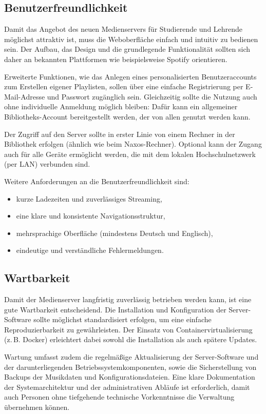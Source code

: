\documentclass[12pt,a4paper]{report}
\begin{document}
  \subsection{Benutzerfreundlichkeit}
  Damit das Angebot des neuen Medienservers für Studierende und Lehrende möglichst attraktiv ist, muss die Weboberfläche einfach und intuitiv zu bedienen sein. 
  Der Aufbau, das Design und die grundlegende Funktionalität sollten sich daher an bekannten Plattformen wie beispielsweise Spotify orientieren.  

  Erweiterte Funktionen, wie das Anlegen eines personalisierten Benutzeraccounts zum Erstellen eigener Playlisten, 
  sollen über eine einfache Registrierung per E-Mail-Adresse und Passwort zugänglich sein.  
  Gleichzeitig sollte die Nutzung auch ohne individuelle Anmeldung möglich bleiben: Dafür kann ein allgemeiner Bibliotheks-Account bereitgestellt werden, 
  der von allen genutzt werden kann.  

  Der Zugriff auf den Server sollte in erster Linie von einem Rechner in der Bibliothek erfolgen (ähnlich wie beim Naxos-Rechner). 
  Optional kann der Zugang auch für alle Geräte ermöglicht werden, die mit dem lokalen Hochschulnetzwerk (per LAN) verbunden sind.  

  Weitere Anforderungen an die Benutzerfreundlichkeit sind:
  \begin{itemize}
    \item kurze Ladezeiten und zuverlässiges Streaming,
    \item eine klare und konsistente Navigationsstruktur,
    \item mehrsprachige Oberfläche (mindestens Deutsch und Englisch),
    \item eindeutige und verständliche Fehlermeldungen.
  \end{itemize}

  \subsection{Wartbarkeit}
  Damit der Medienserver langfristig zuverlässig betrieben werden kann, ist eine gute Wartbarkeit entscheidend. 
  Die Installation und Konfiguration der Server-Software sollte möglichst standardisiert erfolgen, um eine einfache Reproduzierbarkeit zu gewährleisten. 
  Der Einsatz von Containervirtualisierung (z.\,B. Docker) erleichtert dabei sowohl die Installation als auch spätere Updates.  

  Wartung umfasst zudem die regelmäßige Aktualisierung der Server-Software und der darunterliegenden Betriebssystemkomponenten, 
  sowie die Sicherstellung von Backups der Musikdaten und Konfigurationsdateien.  
  Eine klare Dokumentation der Systemarchitektur und der administrativen Abläufe ist erforderlich, 
  damit auch Personen ohne tiefgehende technische Vorkenntnisse die Verwaltung übernehmen können.  
\end{document}
